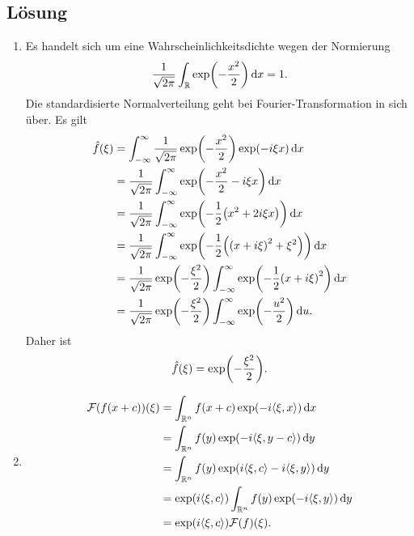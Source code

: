 \documentclass{exercise}
\begin{document}
    \subsection*{Lösung}
    \begin{enumerate}
        \item Es handelt sich um eine Wahrscheinlichkeitsdichte wegen der Normierung
        \[
            \frac{1}{\sqrt{2\pi}}\int_\R \exp\parentheses*{-\frac{x^2}{2}}\d x = 1.
        \]
        Die standardisierte Normalverteilung geht bei Fourier-Transformation in sich über.
        Es gilt
        \begin{align*}
            \hat{f}\parentheses*{\xi} &= \int_{-\infty}^\infty \frac{1}{\sqrt{2\pi}}\exp\parentheses*{-\frac{x^2}{2}}\exp\parentheses*{-i\xi x}\d x\\
            &= \frac{1}{\sqrt{2\pi}}\int_{-\infty}^\infty \exp\parentheses*{-\frac{x^2}{2} - i\xi x}\d x\\
            &= \frac{1}{\sqrt{2\pi}}\int_{-\infty}^\infty \exp\parentheses*{-\frac{1}{2}\parentheses*{x^2 + 2i\xi x}}\d x\\
            &= \frac{1}{\sqrt{2\pi}}\int_{-\infty}^\infty \exp\parentheses*{-\frac{1}{2}\parentheses*{\parentheses*{x + i\xi}^2 + \xi^2}}\d x\\
            &= \frac{1}{\sqrt{2\pi}}\exp\parentheses*{-\frac{\xi^2}{2}}\int_{-\infty}^\infty \exp\parentheses*{-\frac{1}{2}\parentheses*{x + i\xi}^2}\d x\\
            &= \frac{1}{\sqrt{2\pi}}\exp\parentheses*{-\frac{\xi^2}{2}}\int_{-\infty}^\infty \exp\parentheses*{-\frac{u^2}{2}}\d u.
        \end{align*}
        Daher ist
        \[
            \hat{f}\parentheses*{\xi} = \exp\parentheses*{-\frac{\xi^2}{2}}.
        \]
        \item
        \begin{align*}
            \mathcal{F}\parentheses*{f\parentheses*{x + c}}\parentheses*{\xi} &= \int_{\R^n}f\parentheses*{x + c}\exp\parentheses*{-i\angles*{\xi, x}}\d x\\
            &= \int_{\R^n}f\parentheses*{y}\exp\parentheses*{-i\angles*{\xi, y - c}}\d y\\
            &= \int_{\R^n}f\parentheses*{y}\exp\parentheses*{i\angles*{\xi, c} - i\angles*{\xi, y}}\d y\\
            &= \exp\parentheses*{i\angles*{\xi, c}}\int_{\R^n}f\parentheses*{y}\exp\parentheses*{-i\angles*{\xi, y}}\d y\\
            &= \exp\parentheses*{i\angles*{\xi, c}}\mathcal{F}\parentheses*{f}\parentheses*{\xi}.
        \end{align*}
    \end{enumerate}
\end{document}
